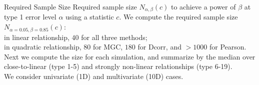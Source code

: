 \documentclass[mathserif,t]{beamer}
\newcommand{\Mgc}{MGC}
\begin{document}



\begin{frame}{Required Sample Size}
\pause
Required sample size $N_{\alpha,\beta}(c)$ to achieve a power of $\beta$ at type 1 error level $\alpha$ using a statistic $c$. We compute the required sample size $N_{\alpha=0.05,\beta=0.85}(c)$: \\
\medskip
\pause
in linear relationship, $40$ for all three methods; \\
in quadratic relationship, $80$ for \Mgc, $180$ for Dcorr, and $>1000$ for Pearson.\\

\medskip
\pause
Next we compute the size for each simulation, and summarize by the median over close-to-linear (type 1-5) and strongly non-linear relationships (type 6-19). \\

\medskip
\pause
We consider univariate (1D) and multivariate (10D) cases.\\ %
\end{frame}
\end{document}

